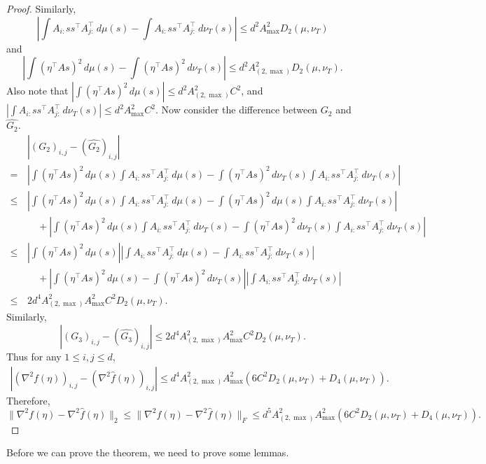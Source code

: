 \begin{proof}
Similarly, 
\[
\left| \int A_{i:}ss^{\top}A_{j:}^{\top} \,d\mu(s) - \int A_{i:}ss^{\top}A_{j:}^{\top} \,d\nu_T(s) \right| \le d^2 A_{\max}^2 D_2(\mu,\nu_T)
\]
 and 
\[
\left| \int (\eta^{\top}As)^2\,d\mu(s) -\int (\eta^{\top}As)^2\,d\nu_T(s) \right| \le d^2 A_{(2,\max)}^2 D_2(\mu,\nu_T).
\]
Also note that $ \left| \int (\eta^{\top}As)^2\,d\mu(s) \right| \le d^2A_{(2,\max)}^2 C^2$, and
$\left| \int A_{i:}ss^{\top}A_{j:}^{\top} \,d\nu_T(s) \right| \le d^2A_{\max}^2 C^2$.
Now consider the difference between $G_2$ and $\widehat{G_2}$. 
\begin{align*}
& \left| (G_2)_{i,j} - (\widehat{G_2})_{i,j} \right| \\
=\, & \left| \int (\eta^{\top}As)^2\,d\mu(s) \int A_{i:}ss^{\top}A_{j:}^{\top} \,d\mu(s)  - 
\int (\eta^{\top}As)^2\,d\nu_T(s) \int A_{i:}ss^{\top}A_{j:}^{\top} \,d\nu_T(s) \right| \\
\le \, & \left| \int (\eta^{\top}As)^2\,d\mu(s) \int A_{i:}ss^{\top}A_{j:}^{\top} \,d\mu(s)  - 
\int (\eta^{\top}As)^2\,d\mu(s) \int A_{i:}ss^{\top}A_{j:}^{\top} \,d\nu_T(s) \right| \\ 
& \quad + \left| \int (\eta^{\top}As)^2\,d\mu(s) \int A_{i:}ss^{\top}A_{j:}^{\top} \,d\nu_T(s)  - 
\int (\eta^{\top}As)^2\,d\nu_T(s) \int A_{i:}ss^{\top}A_{j:}^{\top} \,d\nu_T(s) \right| \\
\le\, & \left| \int (\eta^{\top}As)^2\,d\mu(s) \right| \left|\int A_{i:}ss^{\top}A_{j:}^{\top} \,d\mu(s) - \int A_{i:}ss^{\top}A_{j:}^{\top} \,d\nu_T(s) \right| \\
& \quad + \left| \int (\eta^{\top}As)^2\,d\mu(s) -\int (\eta^{\top}As)^2\,d\nu_T(s) \right| \left| \int A_{i:}ss^{\top}A_{j:}^{\top} \,d\nu_T(s) \right| \\
\le\, & 2 d^4  A_{(2,\max)}^2A_{\max}^2C^2D_2(\mu, \nu_T).
\end{align*}
Similarly,
\[
\left| (G_3)_{i,j} - (\widehat{G_3})_{i,j} \right| \le 2 d^4  A_{(2,\max)}^2A_{\max}^2C^2D_2(\mu, \nu_T).
\]
Thus for any $1\le i,j\le d$,
\begin{align*}
\left|\left(\nabla^2 f(\eta)\right)_{i,j} - \left(\nabla^2 \widehat{f}(\eta) \right)_{i,j} \right| 
\le 
d^4  A_{(2,\max)}^2A_{\max}^2\left( 6C^2D_2(\mu, \nu_T) + D_4(\mu, \nu_T)\right).
\end{align*}
Therefore, 
\[
\|\nabla^2 f(\eta) - \nabla^2 \widehat{f}(\eta)  \|_2 \le \|\nabla^2 f(\eta) - \nabla^2 \widehat{f}(\eta)  \|_F \le d^5  A_{(2,\max)}^2A_{\max}^2\left( 6C^2D_2(\mu, \nu_T) + D_4(\mu, \nu_T)\right).
\]
\end{proof}
Before we can prove the theorem, we need to prove some lemmas.

